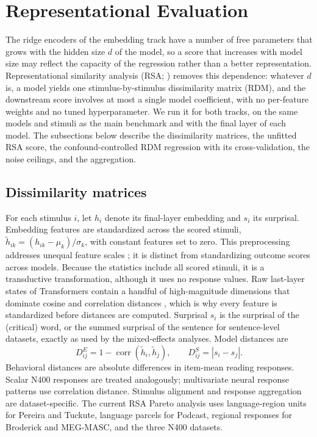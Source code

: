 \section{Representational Evaluation}
\label{app:rsa}

The ridge encoders of the embedding track have a number of free parameters that grows with the hidden size $d$ of the model, so a score that increases with model size may reflect the capacity of the regression rather than a better representation. Representational similarity analysis (RSA; \citealp{kriegeskorte2008rsa}) removes this dependence: whatever $d$ is, a model yields one stimulus-by-stimulus dissimilarity matrix (RDM), and the downstream score involves at most a single model coefficient, with no per-feature weights and no tuned hyperparameter. We run it for both tracks, on the same models and stimuli as the main benchmark and with the final layer of each model. The subsections below describe the dissimilarity matrices, the unfitted RSA score, the confound-controlled RDM regression with its cross-validation, the noise ceilings, and the aggregation.

\subsection{Dissimilarity matrices}
\label{app:rsa-rdms}

For each stimulus $i$, let $h_i$ denote its final-layer embedding and $s_i$ its surprisal. Embedding features are standardized across the scored stimuli, $\widetilde h_{ik}=(h_{ik}-\mu_k)/\sigma_k$, with constant features set to zero. This preprocessing addresses unequal feature scales \citep{timkey2021allbark}; it is distinct from standardizing outcome scores across models. Because the statistics include all scored stimuli, it is a transductive transformation, although it uses no response values. Raw last-layer states of Transformers contain a handful of high-magnitude dimensions that dominate cosine and correlation distances \citep{timkey2021allbark}, which is why every feature is standardized before distances are computed. Surprisal $s_i$ is the surprisal of the (critical) word, or the summed surprisal of the sentence for sentence-level datasets, exactly as used by the mixed-effects analyses. Model distances are
\[
D^E_{ij}=1-\operatorname{corr}(\widetilde h_i,\widetilde h_j),\qquad D^S_{ij}=|s_i-s_j|.
\]
Behavioral distances are absolute differences in item-mean reading responses. Scalar N400 responses are treated analogously; multivariate neural response patterns use correlation distance. Stimulus alignment and response aggregation are dataset-specific. The current RSA Pareto analysis uses language-region units for Pereira and Tuckute, language parcels for Podcast, regional responses for Broderick and MEG-MASC, and the three N400 datasets.

